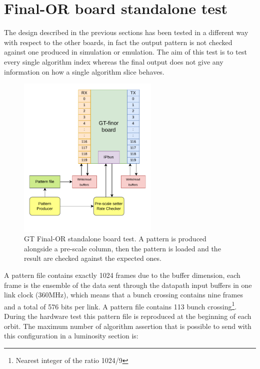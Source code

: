 \documentclass[../../main.tex]{subfiles}
\begin{document}
\begin{figure}[!h]
    
\end{figure}

\clearpage
\section{Final-OR board standalone test}
\label{sec:Finor_standalone}

The design described in the previous sections has been tested in a different way with respect to the other boards, in fact the output pattern is not checked against one produced in simulation or emulation. The aim of this test is to test every single algorithm index whereas the final output does not give any information on how a single algorithm slice behaves.  

\begin{figure}[!h]
    \centering
    \includegraphics[width=0.6\textwidth]{sections/06/Images/Finor_test.pdf}
    \caption{GT Final-OR standalone board test. A pattern is produced alongside a pre-scale column, then the pattern is loaded and the result are checked against the expected ones.}
    \label{fig:Finor_board_test}
\end{figure}

A pattern file contains exactly 1024 frames due to the buffer dimension, each frame is the ensemble of the data sent through the datapath input buffers in one link clock (360MHz), which means that a bunch crossing contains nine frames and a total of 576 bits per link. A pattern file contains 113 bunch crossing\footnote{Nearest integer of the ratio 1024/9}. During the hardware test this pattern file is reproduced at the beginning of each orbit. The maximum number of algorithm assertion that is possible to send with this configuration in a luminosity section is:
\end{document}
